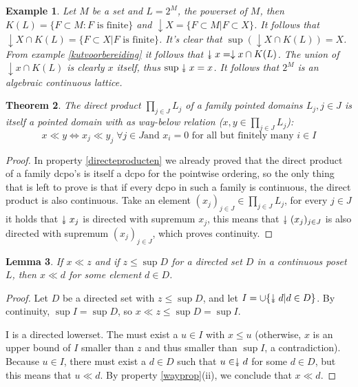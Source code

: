 \documentclass[a4paper,12pt]{article}
\newcommand{\downdownarrow}{\mathrel{\reflectbox{\rotatebox[origin=c]{90}{$\twoheadleftarrow$}}}}
\newtheorem{theorem}{Theorem}[section]
\newtheorem{lemma}[theorem]{Lemma}
\newtheorem{example}[theorem]{Example}
\begin{document}
\begin{example}\label{2Malg}
Let $M$ be a set and $L = 2^M$, the powerset of $M$, then $K(L)= \{F \subset M: F \text{ is finite}\}$ and $\downarrow X = \{F \subset M| F \subset X\}$. It follows that $\downarrow X \cap K(L) = \{F \subset X | F \text{ is finite}\}$. It's clear that $\sup(\downarrow X \cap K(L)) = X$. From example \ref{kutvoorbereiding} it follows that $\downdownarrow x = \downarrow x \cap K(L)$. The union of $\downarrow x \cap K(L)$ is clearly $x$ itself, thus $\sup \downdownarrow x = x$. It follows that $2^M$ is an algebraic continuous lattice.
\end{example}

\begin{theorem}
The direct product $\prod_{j\in J}L_j$ of a family  pointed domains $L_j, j \in J$ is itself a pointed domain with as way-below relation ($x, y \in \prod_{j \in J}L_j$):
$$x \ll y \Leftrightarrow x_j \ll y_j \;\forall j \in J \text{and } x_i = 0 \text{ for all but finitely many } i \in I$$
\end{theorem}

\begin{proof}
In property \ref{directeproducten} we already proved that the direct product of a family dcpo's is itself a dcpo for the pointwise ordering, so the only thing that is left to prove is that if every dcpo in such a family is continuous, the direct product is also continuous. Take an element $(x_j)_{j\in J} \in \prod_{j \in J}L_j$, for every $j \in J$ it holds that $\downdownarrow x_j$ is directed with supremum $x_j$, this means that $\downdownarrow(x_j)_{j\in J}$ is also directed with supremum $(x_j)_{j\in J}$, which proves continuity.
\end{proof}


\begin{lemma}\label{lemmavoor}
If $x \ll z$ and if $z \leq \sup D$ for a directed set $D$ in a continuous poset $L$, then $x \ll d$ for some element $d \in D$.
\end{lemma}

\begin{proof}
Let $D$ be a directed set with $z \leq \sup D$, and let $I = \cup\{\downdownarrow d | d \in D\}$. By continuity, $\sup I = \sup D$, so $x \ll z \leq \sup D = \sup I$. 

I is a directed lowerset. The must exist a $u \in I$ with $x \leq u$ (otherwise, $x$ is an upper bound of $I$ smaller than $z$ and thus smaller than $\sup I$, a contradiction). Because $u \in I$, there must exist a $d \in D$ such that $u \in \downdownarrow d$ for some $d \in D$, but this means that $u \ll d$. By property \ref{wayprop}(ii), we conclude that $x \ll d$.
\end{proof}
\end{document}
